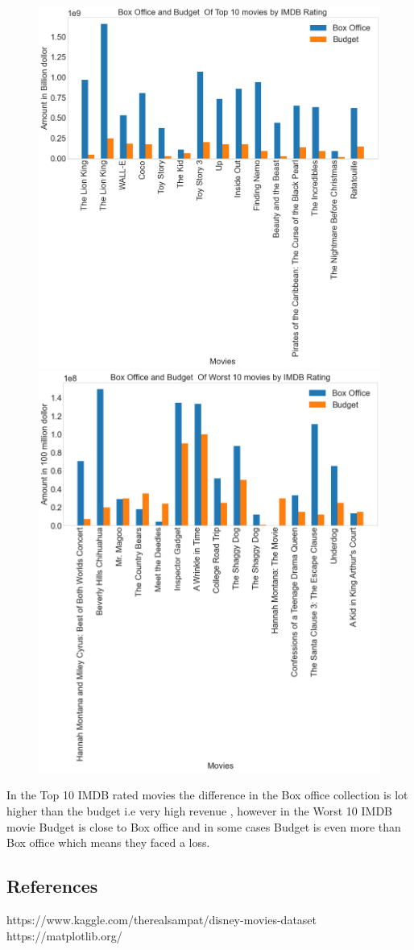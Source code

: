 \documentclass{article}
\begin{document}
    \begin{figure}[htp]
    \centering
       \includegraphics[width=.36\textwidth]{figures/6.png}\hfill
    \includegraphics[width=.36\textwidth]{figures/7.png}
    
    
    \end{figure}

In the Top 10 IMDB rated movies the difference in the  Box office collection is lot higher than the budget i.e very high revenue , however in the Worst 10 IMDB movie Budget is close to  Box office and in some cases Budget is even more than Box office which means they faced a loss.


\subsection{References}

https://www.kaggle.com/therealsampat/disney-movies-dataset \\
https://matplotlib.org/
\end{document}
